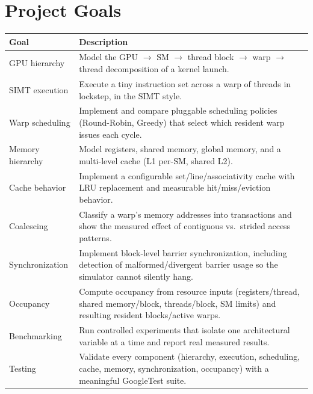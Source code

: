 \documentclass[11pt]{article}
\begin{document}
\section{Project Goals}

\begin{longtable}{@{}p{4cm}p{10.5cm}@{}}
\toprule
\textbf{Goal} & \textbf{Description} \\
\midrule
\endhead
GPU hierarchy & Model the GPU $\rightarrow$ SM $\rightarrow$ thread block
$\rightarrow$ warp $\rightarrow$ thread decomposition of a kernel launch. \\
SIMT execution & Execute a tiny instruction set across a warp of threads in
lockstep, in the SIMT style. \\
Warp scheduling & Implement and compare pluggable scheduling policies
(Round-Robin, Greedy) that select which resident warp issues each cycle. \\
Memory hierarchy & Model registers, shared memory, global memory, and a
multi-level cache (L1 per-SM, shared L2). \\
Cache behavior & Implement a configurable set/line/associativity cache with
LRU replacement and measurable hit/miss/eviction behavior. \\
Coalescing & Classify a warp's memory addresses into transactions and show
the measured effect of contiguous vs.\ strided access patterns. \\
Synchronization & Implement block-level barrier synchronization, including
detection of malformed/divergent barrier usage so the simulator cannot
silently hang. \\
Occupancy & Compute occupancy from resource inputs (registers/thread,
shared memory/block, threads/block, SM limits) and resulting resident
blocks/active warps. \\
Benchmarking & Run controlled experiments that isolate one architectural
variable at a time and report real measured results. \\
Testing & Validate every component (hierarchy, execution, scheduling,
cache, memory, synchronization, occupancy) with a meaningful GoogleTest
suite. \\
\bottomrule
\end{longtable}

\end{document}
